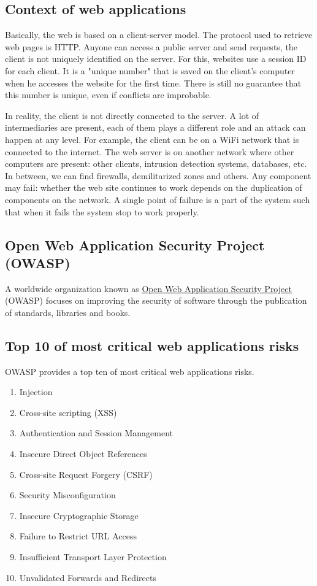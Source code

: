 \subsection{Context of web applications}

Basically, the web is based on a client-server model. The protocol used to
retrieve web pages is HTTP. Anyone can access a public server and send
requests, the client is not uniquely identified on the server.
For this, websites use a session ID for each client. It is a "unique number"
that is saved on the client's computer when he accesses the website for the
first time. There is still no guarantee that this number is unique, even if
conflicts are improbable.

In reality, the client is not directly connected to the server. A lot of
intermediaries are present, each of them plays a different role and an attack
can happen at any level.
For example, the client can be on a WiFi network that is connected to the
internet. The web server is on another network where other computers are
present: other clients, intrusion detection systems, databases, etc. In
between, we can find firewalls, demilitarized zones and others.
Any component may fail: whether the web site continues to work depends on the
duplication of components on the network. A single point of failure is a part
of the system such that when it fails the system stop to work properly.

\subsection{Open Web Application Security Project (OWASP)}

A worldwide organization known as \href{https://www.owasp.org/}{Open Web
Application Security Project} (OWASP) focuses on improving the security of
software through the publication of standards, libraries and books.

\subsection{Top 10 of most critical web applications risks}

OWASP provides a top ten of most critical web applications risks.
\begin{enumerate}
\item Injection
\item Cross-site scripting (XSS)
\item Authentication and Session Management
\item Insecure Direct Object References
\item Cross-site Request Forgery (CSRF)
\item Security Misconfiguration
\item Insecure Cryptographic Storage
\item Failure to Restrict URL Access
\item Insufficient Transport Layer Protection
\item Unvalidated Forwards and Redirects
\end{enumerate}


